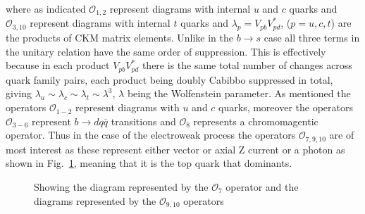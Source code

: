 where as indicated $\mathcal{O}_{1,2}$ represent diagrams with internal $u$ and $c$ quarks and $\mathcal{O}_{3,10}$ represent diagrams with internal $t$ quarks and $\lambda_{p} = V_{pb}V^{*}_{pd}$, ($p = u,c,t$) are the products of CKM matrix elements. Unlike in the $b\to s$ case all three terms in the unitary relation have the same order of suppression. This is effectively because in each product $V_{pb}V^{*}_{pd}$ there is the same total number of changes across quark family pairs, each product being doubly Cabibbo suppressed in total, giving $\lambda_{u} \sim \lambda_{c} \sim \lambda_{t} \sim \lambda^{3}$, $\lambda$ being the Wolfenstein parameter. As mentioned the operators $\mathcal{O}_{1-2}$ represent diagrams with $u$ and $c$ quarks, moreover the operators $\mathcal{O}_{3-6}$ represent $b\to dq\overline{q}$ transitions and $\mathcal{O}_{8}$ represents a chromomagentic operator. Thus in the case of the electroweak process the operators $\mathcal{O}_{7,9,10}$ are of most interest as these represent either vector or axial Z current or a photon as shown in Fig.~\ref{fig:wilson7910}, meaning that it is the top quark that dominants.
\begin{figure}[ht!]
    \centering
  \hspace*{-2cm}
           \caption{Showing \protect{} the diagram represented by the $\mathcal{O}_{7}$ operator and\protect{} the diagrams represented by the $\mathcal{O}_{9,10}$ operators~\cite{lowrecoil}}
           \label{fig:wilson7910}
\end{figure}


